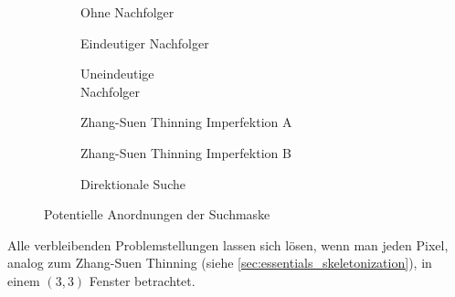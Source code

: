 \begin{figure}[ht]
    \begin{subfigure}[t]{0.3\textwidth}
        \centering
        
        \caption{Ohne Nachfolger}%
        \label{fig:theory_segmentation_mask_none}
    \end{subfigure}
    \hfill
    \begin{subfigure}[t]{0.3\textwidth}
        \centering
        
        \caption{Eindeutiger Nachfolger}%
        \label{fig:theory_segmentation_mask_one}
    \end{subfigure}
    \hfill
    \begin{subfigure}[t]{0.3\textwidth}
        \centering
        
        \caption{Uneindeutige\\Nachfolger}%
        \label{fig:theory_segmentation_mask_non_adjacent}
    \end{subfigure}

    \begin{subfigure}[t]{0.3\textwidth}
        \centering
        
        \caption{Zhang-Suen Thinning Imperfektion A}%
        \label{fig:theory_segmentation_mask_two}
    \end{subfigure}
    \hfill
    \begin{subfigure}[t]{0.3\textwidth}
        \centering
        
        \caption{Zhang-Suen Thinning Imperfektion B}%
        \label{fig:theory_segmentation_mask_three}
    \end{subfigure}
    \hfill
    \begin{subfigure}[t]{0.3\textwidth}
        \centering
        
        \caption{Direktionale Suche}%
        \label{fig:theory_segmentation_mask_direction}
    \end{subfigure}
    \caption{Potentielle Anordnungen der Suchmaske}
\end{figure}

Alle verbleibenden Problemstellungen lassen sich lösen, wenn man jeden Pixel, analog zum Zhang-Suen Thinning (siehe \autoref{sec:essentials_skeletonization}), in einem \((3,3)\) Fenster betrachtet.

